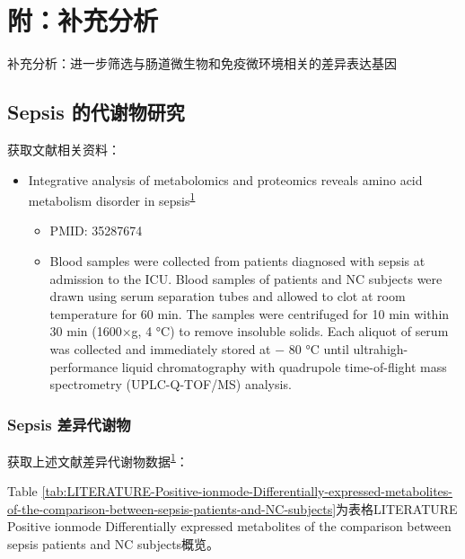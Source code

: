 \documentclass[
]{article}
\providecommand{\tightlist}{%
  \setlength{\itemsep}{0pt}\setlength{\parskip}{0pt}}
\begin{document}
\hypertarget{supp}{%
\section{附：补充分析}\label{supp}}

补充分析：进一步筛选与肠道微生物和免疫微环境相关的差异表达基因

\hypertarget{sepsis-ux7684ux4ee3ux8c22ux7269ux7814ux7a76}{%
\subsection{Sepsis 的代谢物研究}\label{sepsis-ux7684ux4ee3ux8c22ux7269ux7814ux7a76}}

获取文献相关资料：

\begin{itemize}
\tightlist
\item
  Integrative analysis of metabolomics and proteomics reveals amino acid
  metabolism disorder in sepsis\textsuperscript{\protect\hyperlink{ref-IntegrativeAnaChen2022}{1}}

  \begin{itemize}
  \tightlist
  \item
    PMID: 35287674
  \item
    Blood samples were collected from patients diagnosed with sepsis at
    admission to the ICU. Blood samples of patients and NC subjects were
    drawn using serum separation tubes and allowed to clot at room
    temperature for 60 min. The samples were centrifuged for 10 min within 30
    min (1600×g, 4 °C) to remove insoluble solids. Each aliquot of serum was
    collected and immediately stored at − 80 °C until ultrahigh-performance
    liquid chromatography with quadrupole time-of-flight mass spectrometry
    (UPLC-Q-TOF/MS) analysis.
  \end{itemize}
\end{itemize}

\hypertarget{diff-meta}{%
\subsubsection{Sepsis 差异代谢物}\label{diff-meta}}

获取上述文献差异代谢物数据\textsuperscript{\protect\hyperlink{ref-IntegrativeAnaChen2022}{1}}：

Table \ref{tab:LITERATURE-Positive-ionmode-Differentially-expressed-metabolites-of-the-comparison-between-sepsis-patients-and-NC-subjects}为表格LITERATURE Positive ionmode Differentially expressed metabolites of the comparison between sepsis patients and NC subjects概览。
\end{document}
